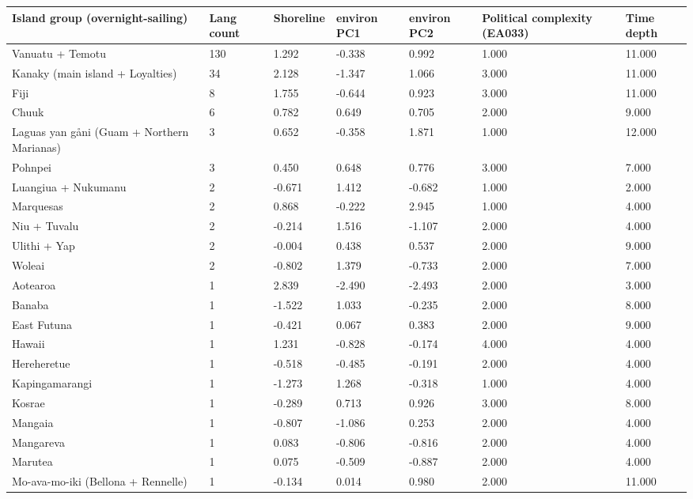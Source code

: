 \begin{longtable}{p{4.5cm}p{1.4cm}p{1.4cm}p{1.4cm}p{1.4cm}p{1.7cm}p{1.7cm}}
  \toprule
Island group (overnight-sailing) & Lang count & Shoreline & environ PC1 & environ PC2 & Political complexity (EA033) & Time depth \\ 
  \midrule
Vanuatu + Temotu & 130 & 1.292 & -0.338 & 0.992 & 1.000 & 11.000 \\ 
  Kanaky (main island + Loyalties) & 34 & 2.128 & -1.347 & 1.066 & 3.000 & 11.000 \\ 
  Fiji & 8 & 1.755 & -0.644 & 0.923 & 3.000 & 11.000 \\ 
  Chuuk & 6 & 0.782 & 0.649 & 0.705 & 2.000 & 9.000 \\ 
  Laguas yan gåni (Guam + Northern Marianas) & 3 & 0.652 & -0.358 & 1.871 & 1.000 & 12.000 \\ 
  Pohnpei & 3 & 0.450 & 0.648 & 0.776 & 3.000 & 7.000 \\ 
  Luangiua + Nukumanu & 2 & -0.671 & 1.412 & -0.682 & 1.000 & 2.000 \\ 
  Marquesas & 2 & 0.868 & -0.222 & 2.945 & 1.000 & 4.000 \\ 
  Niu + Tuvalu & 2 & -0.214 & 1.516 & -1.107 & 2.000 & 4.000 \\ 
  Ulithi + Yap & 2 & -0.004 & 0.438 & 0.537 & 2.000 & 9.000 \\ 
  Woleai & 2 & -0.802 & 1.379 & -0.733 & 2.000 & 7.000 \\ 
  Aotearoa & 1 & 2.839 & -2.490 & -2.493 & 2.000 & 3.000 \\ 
  Banaba & 1 & -1.522 & 1.033 & -0.235 & 2.000 & 8.000 \\ 
  East Futuna & 1 & -0.421 & 0.067 & 0.383 & 2.000 & 9.000 \\ 
  Hawaii & 1 & 1.231 & -0.828 & -0.174 & 4.000 & 4.000 \\ 
  Hereheretue & 1 & -0.518 & -0.485 & -0.191 & 2.000 & 4.000 \\ 
  Kapingamarangi & 1 & -1.273 & 1.268 & -0.318 & 1.000 & 4.000 \\ 
  Kosrae & 1 & -0.289 & 0.713 & 0.926 & 3.000 & 8.000 \\ 
  Mangaia & 1 & -0.807 & -1.086 & 0.253 & 2.000 & 4.000 \\ 
  Mangareva & 1 & 0.083 & -0.806 & -0.816 & 2.000 & 4.000 \\ 
  Marutea & 1 & 0.075 & -0.509 & -0.887 & 2.000 & 4.000 \\ 
  Mo-ava-mo-iki (Bellona + Rennelle) & 1 & -0.134 & 0.014 & 0.980 & 2.000 & 11.000 \\ 

\end{longtable}
